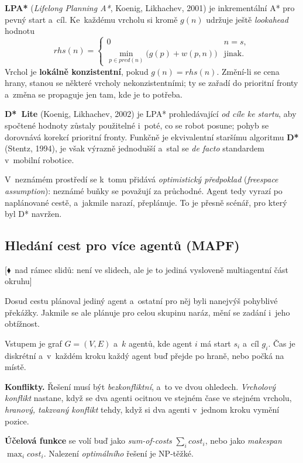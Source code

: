 \documentclass[11pt,a4paper]{article}
\theoremstyle{definition}
\newcommand{\mimoq}[1]{\textcolor{markcol}{\textsf{\footnotesize[$\blacklozenge$~nad rámec slidů: #1]}}}
\begin{document}
\begin{defbox}
\textbf{LPA*} (\emph{Lifelong Planning A*}, Koenig, Likhachev, 2001) je inkrementální A* pro
pevný start a~cíl. Ke~každému vrcholu si kromě $g(n)$ udržuje ještě \emph{lookahead} hodnotu
\[
\mathit{rhs}(n) = \begin{cases}
0 & n = s,\\
\min_{p \in \mathit{pred}(n)} \big(g(p) + w(p,n)\big) & \text{jinak.}
\end{cases}
\]
Vrchol je \textbf{lokálně konzistentní}, pokud $g(n) = \mathit{rhs}(n)$. Změní-li se cena hrany,
stanou se některé vrcholy nekonzistentními; ty se zařadí do prioritní fronty a~změna se propaguje
jen tam, kde je to potřeba.

\textbf{D*~Lite} (Koenig, Likhachev, 2002) je LPA* prohledávající \emph{od cíle ke startu}, aby
spočtené hodnoty zůstaly použitelné i~poté, co se robot posune; pohyb se dorovnává korekcí
prioritní fronty. Funkčně je ekvivalentní staršímu algoritmu \textbf{D*} (Stentz, 1994), je však
výrazně jednodušší a~stal se \emph{de facto} standardem v~mobilní robotice.
\end{defbox}

V~neznámém prostředí se k~tomu přidává \emph{optimistický předpoklad}
(\emph{freespace assumption}): neznámé buňky se považují za průchodné. Agent tedy vyrazí po
naplánované cestě, a~jakmile narazí, přeplánuje. To je přesně scénář, pro který byl D* navržen.

\subsection{Hledání cest pro více agentů (MAPF)}
\label{ssec:mapf}

\noindent\mimoq{není ve slidech, ale je to jediná vysloveně multiagentní část okruhu}

Dosud cestu plánoval jediný agent a~ostatní pro něj byli nanejvýš pohyblivé překážky. Jakmile se
ale plánuje pro celou skupinu naráz, mění se zadání i~jeho obtížnost.

\begin{defbox}
Vstupem je graf $G=(V,E)$ a~$k$ agentů, kde agent $i$ má start $s_i$ a~cíl $g_i$. Čas je
diskrétní a~v~každém kroku každý agent buď přejde po hraně, nebo počká na místě.

\textbf{Konflikty.} Řešení musí být \emph{bezkonfliktní}, a~to ve dvou ohledech.
\emph{Vrcholový konflikt} nastane, když se dva agenti ocitnou ve stejném čase ve stejném vrcholu,
\emph{hranový, takzvaný  konflikt} tehdy, když si dva agenti v~jednom kroku vymění
pozice.

\textbf{Účelová funkce} se volí buď jako \emph{sum-of-costs} $\sum_i \mathit{cost}_i$, nebo jako
\emph{makespan} $\max_i \mathit{cost}_i$. Nalezení \emph{optimálního} řešení je NP-těžké.
\end{defbox}
\end{document}
